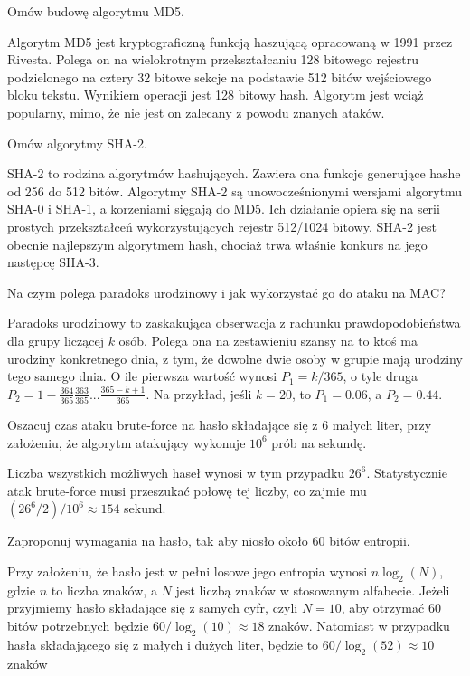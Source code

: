 \documentclass[answers,11pt]{exam}
\begin{document}
\begin{questions}
\question Omów budowę algorytmu MD5.
\begin{solution}
Algorytm MD5 jest kryptograficzną funkcją haszującą opracowaną w 1991 przez Rivesta. Polega on na wielokrotnym przekształcaniu 128 bitowego rejestru podzielonego na cztery 32 bitowe sekcje na podstawie 512 bitów wejściowego bloku tekstu. Wynikiem operacji jest 128 bitowy hash. Algorytm jest wciąż popularny, mimo, że nie jest on zalecany z powodu znanych ataków.
\end{solution}

\question Omów algorytmy SHA-2.
\begin{solution}
SHA-2 to rodzina algorytmów hashujących. Zawiera ona funkcje generujące hashe od 256 do 512 bitów. Algorytmy SHA-2 są unowocześnionymi wersjami algorytmu SHA-0 i SHA-1, a korzeniami sięgają do MD5. Ich działanie opiera się na serii prostych przekształceń wykorzystujących rejestr 512/1024 bitowy. SHA-2 jest obecnie najlepszym algorytmem hash, chociaż trwa właśnie konkurs na jego następcę SHA-3.
\end{solution}

\question Na czym polega paradoks urodzinowy i jak wykorzystać go do ataku na MAC?
\begin{solution}
Paradoks urodzinowy to zaskakująca obserwacja z rachunku prawdopodobieństwa dla grupy liczącej  $k$ osób. Polega ona na zestawieniu szansy na to ktoś ma urodziny konkretnego dnia, z tym, że dowolne dwie osoby w grupie mają urodziny tego samego dnia. O ile pierwsza wartość wynosi $P_1 = k/365$, o tyle druga $P_2 = 1 - \frac{364}{365}\frac{363}{365} ... \frac{365-k+1}{365}$. 
Na przykład, jeśli $k=20$, to $P_1 = 0.06$, a $P_2 = 0.44$. 
\end{solution}

\question Oszacuj czas ataku brute-force na hasło składające się z 6 małych liter, przy założeniu, że algorytm atakujący wykonuje $10^6$ prób na sekundę.
\begin{solution}
Liczba wszystkich możliwych haseł wynosi w tym przypadku $26^6$. Statystycznie atak brute-force musi przeszukać połowę tej liczby, co zajmie mu $(26^6 / 2 ) / 10^6 \approx 154$ sekund.
\end{solution}

\question Zaproponuj wymagania na hasło, tak aby niosło około 60 bitów entropii.
\begin{solution}
Przy założeniu, że hasło jest w pełni losowe jego entropia wynosi $n \log_2(N)$, gdzie $n$ to liczba znaków, a $N$ jest liczbą znaków w stosowanym alfabecie. Jeżeli przyjmiemy hasło składające się z samych cyfr, czyli $N=10$, aby otrzymać 60 bitów potrzebnych będzie $60/\log_2(10) \approx 18$ znaków. Natomiast w przypadku hasła składającego się z małych i dużych liter, będzie to $60/\log_2(52) \approx 10 $ znaków
\end{solution}


\end{questions}
\end{document}
